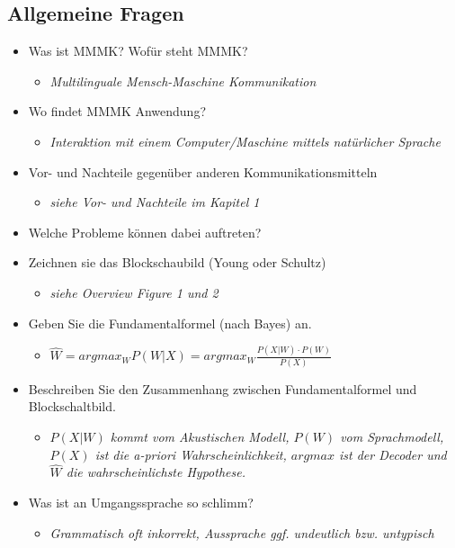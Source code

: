 \documentclass[11pt]{article}
\begin{document}
\subsection{Allgemeine Fragen}
\begin{itemize}
\item Was ist MMMK? Wofür steht MMMK?
\begin{itemize}
\item \emph{Multilinguale Mensch-Maschine Kommunikation}
\end{itemize}
\item Wo findet MMMK Anwendung?
\begin{itemize}
\item \emph{Interaktion mit einem Computer/Maschine  mittels natürlicher Sprache}
\end{itemize}
\item Vor- und Nachteile gegenüber anderen Kommunikationsmitteln
\begin{itemize}
\item \emph{siehe Vor- und Nachteile im Kapitel 1} %
\end{itemize}
\item Welche Probleme können dabei auftreten?
\item Zeichnen sie das Blockschaubild (Young oder Schultz)
\begin{itemize}
\item \emph{siehe Overview Figure 1 und 2} %
\end{itemize}
\item Geben Sie die Fundamentalformel (nach Bayes) an.
\begin{itemize}
\item $\hat{W} = argmax_{W} P(W | X) = argmax_{W} \frac{P(X|W) \cdot P(W)}{P(X)}$ 
\end{itemize}
\item Beschreiben Sie den Zusammenhang zwischen Fundamentalformel und Blockschaltbild.
\begin{itemize}
\item\emph{$P(X|W)$ kommt vom Akustischen Modell, $P(W)$ vom Sprachmodell, $P(X)$ ist die a-priori Wahrscheinlichkeit, 
$argmax$ ist der Decoder und $\hat{W}$ die wahrscheinlichste Hypothese.}
\end{itemize}
\item Was ist an Umgangssprache so schlimm?
\begin{itemize}
\item \emph{Grammatisch oft inkorrekt, Aussprache ggf. undeutlich bzw. untypisch}

\end{itemize}
\end{itemize}
\end{document}
